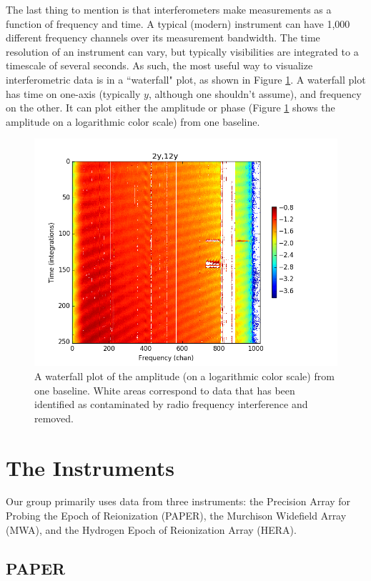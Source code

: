 The last thing to mention is that interferometers make measurements as a function of frequency
and time.
A typical (modern) instrument can have 1,000 different frequency channels over its measurement
bandwidth.  The time resolution of an instrument can vary, but typically visibilities
are integrated to a timescale of several seconds.  As such, the most useful way to visualize 
interferometric data is in a ``waterfall" plot, as shown in Figure \ref{fig:waterfall}.
A waterfall plot has time on one-axis (typically $y$, although one shouldn't assume),
and frequency on the other.  It can plot either the amplitude or phase (Figure
\ref{fig:waterfall} shows the amplitude on a logarithmic color scale) from one baseline.
\begin{figure}[htbp!]
\centering
\includegraphics[width=4.5in]{figures/waterfall.png}
\caption{A waterfall plot of the amplitude (on a logarithmic color scale) from one baseline.  White
areas correspond to data that has been identified as contaminated by radio frequency interference
and removed.}
\label{fig:waterfall}
\end{figure}


\section{The Instruments}

Our group primarily uses data from three instruments: the Precision Array for Probing the
Epoch of Reionization (PAPER), the Murchison Widefield Array (MWA), and the
Hydrogen Epoch of Reionization Array (HERA).

\subsection{PAPER}

